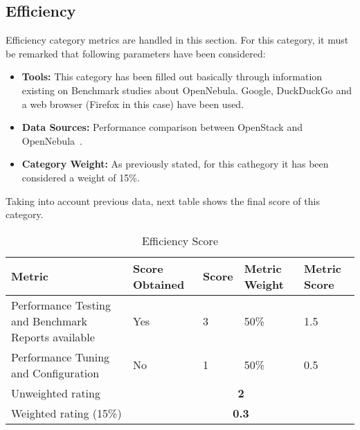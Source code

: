 \documentclass[11pt]{article}
\begin{document}
\subsection{Efficiency}
Efficiency category metrics are handled in this section. For this category, it must be remarked that following parameters have been considered:
\begin{itemize}\itemsep0pt
\item{\textbf{Tools:}} This category has been filled out basically through information existing on Benchmark studies about OpenNebula. Google, DuckDuckGo and a web browser (Firefox in this case) have been used.
\item{\textbf{Data Sources:}} Performance comparison between OpenStack and OpenNebula~\cite{BENCH00}.
\item{\textbf{Category Weight:}} As previously stated, for this cathegory it has been considered a weight of 15\%.
\end{itemize}
Taking into account previous data, next table shows the final score of this category.
\begin{table}[H]
  \begin{center}
    \begin{tabular}{ | p{4cm} | p{3cm} | l | p{1.2cm} | p{1.2cm} | }
    \hline
    \textbf{Metric} & \textbf{Score Obtained} & \textbf{Score} & \textbf{Metric Weight} & \textbf{Metric Score}\\
    \hline
    Performance Testing and Benchmark Reports available & Yes & 3 & 50\% & 1.5\\
    \hline
    Performance Tuning and Configuration & No & 1 & 50\% & 0.5\\
    \hline
    Unweighted rating & \multicolumn{4}{c|}{\textbf{2}}\\
    \hline
    Weighted rating (15\%) & \multicolumn {4}{c|}{\textbf{0.3}}\\
    \hline
    \end{tabular}
    \caption{Efficiency Score}
    \label{tab:effi_score}
  \end{center}
\end{table}
\end{document}
